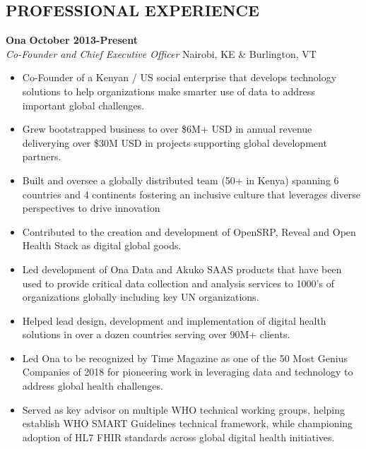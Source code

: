 \documentclass{res}
\begin{document}
\thispagestyle{empty} %

\address{ 46 Brewer Parkway \\   South Burlington, Vermont, 05403, USA \\ +1.202.823.5864}      
                                      
\address{mlberg@gmail.com}

\begin{resume}
 
\section{PROFESSIONAL EXPERIENCE} 

\vspace{8pt}
\textbf{Ona} \hfill        \textbf{October 2013-Present} \\
\emph{Co-Founder and Chief Executive Officer}       \hfill   Nairobi, KE \& Burlington, VT

\begin{itemize} \itemsep -2pt %
	\item Co-Founder of a Kenyan / US social enterprise that develops technology solutions to help organizations make smarter use of data to address important global challenges.
	\item Grew bootstrapped business to over \$6M+ USD in annual revenue deliverying over \$30M USD in projects supporting global development partners. 
	\item Built and oversee a globally distributed team (50+ in Kenya) spanning 6 countries and 4 continents fostering an inclusive culture that leverages diverse perspectives to drive innovation
	\item Contributed to the creation and development of OpenSRP, Reveal and Open Health Stack as digital global goods.
	\item Led development of Ona Data and Akuko SAAS products that have been used to provide critical data collection and analysis services to 1000's of organizations globally including key UN organizations.
	\item Helped lead design, development and implementation of digital health solutions in over a dozen countries serving over 90M+ clients. 
	\item Led Ona to be recognized by Time Magazine as one of the 50 Most Genius Companies of 2018 for pioneering work in leveraging data and technology to address global health challenges.
	\item Served as key advisor on multiple WHO technical working groups, helping establish WHO SMART Guidelines technical framework, while championing adoption of HL7 FHIR standards across global digital health initiatives.
\end{itemize} \vspace{-4pt}


\end{resume}
\end{document}
